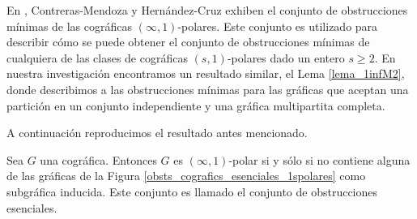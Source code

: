 En \cite{Fernando}, Contreras-Mendoza y Hern\'andez-Cruz
exhiben el conjunto de obstrucciones mínimas de las
cográficas $(\infty, 1)$-polares. Este conjunto es
utilizado para describir cómo se puede obtener el conjunto
de obstrucciones mínimas de cualquiera de las clases de
cográficas $(s,1)$-polares dado un entero $s \ge 2$. En
nuestra investigación encontramos un resultado similar,
el Lema \ref{lema_1infM2}, donde describimos a las obstrucciones
m\'inimas para las gráficas que aceptan una partición en
un conjunto independiente y una gráfica multipartita completa.

A continuaci\'on reproducimos el resultado antes mencionado.

\begin{theorem}
\label{thm:s,1-ess}
  Sea $G$ una cográfica. Entonces $G$ es $(\infty,1)$-polar
  si y sólo si no contiene alguna de las gráficas de la Figura
  \ref{obsts_cografics_esenciales_1spolares} como subgráfica
  inducida. Este conjunto es llamado el conjunto de obstrucciones
  esenciales.
\end{theorem}


